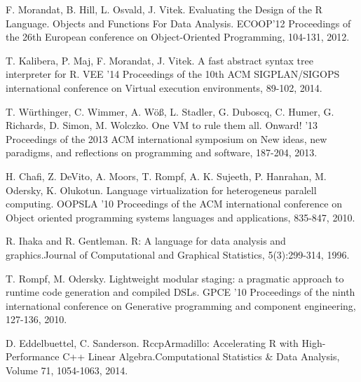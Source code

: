 \documentclass{sigplanconf}
\begin{document}







\begin{thebibliography}{}
\softraggedright


%

\bibitem[]{}
F. Morandat, B. Hill, L. Osvald, J. Vitek. Evaluating the Design of the R Language. Objects and Functions For Data Analysis. ECOOP'12 Proceedings of the 26th European conference on Object-Oriented Programming, 104-131, 2012.

\bibitem[]{}
T. Kalibera, P. Maj, F. Morandat, J. Vitek. A fast abstract syntax tree interpreter for R. VEE '14 Proceedings of the 10th ACM SIGPLAN/SIGOPS international conference on Virtual execution environments, 89-102, 2014. 

\bibitem[]{}
T. Würthinger, C. Wimmer, A. Wöß, L. Stadler, G. Duboscq, C. Humer, G. Richards, D. Simon, M. Wolczko. One VM to rule them all. Onward! '13 Proceedings of the 2013 ACM international symposium on New ideas, new paradigms, and reflections on programming and software, 187-204, 2013.

\bibitem[]{}
H. Chafi, Z. DeVito, A. Moors, T. Rompf, A. K. Sujeeth, P. Hanrahan, M. Odersky, K. Olukotun. Language virtualization for heterogeneus paralell computing. OOPSLA '10 Proceedings of the ACM international conference on Object oriented programming systems languages and applications, 835-847, 2010. 

\bibitem[]{}
R. Ihaka and R. Gentleman. R: A language for data analysis and graphics.Journal of Computational and Graphical Statistics, 5(3):299-314, 1996.

\bibitem[]{}
T. Rompf, M. Odersky. Lightweight modular staging: a pragmatic approach to runtime code generation and compiled DSLs. GPCE '10 Proceedings of the ninth international conference on Generative programming and component engineering, 127-136, 2010. 

\bibitem[]{}
D. Eddelbuettel, C. Sanderson. RccpArmadillo: Accelerating R with High-Performance C++ Linear Algebra.Computational Statistics \& Data Analysis, Volume 71, 1054-1063, 2014.


\end{thebibliography}
\end{document}
